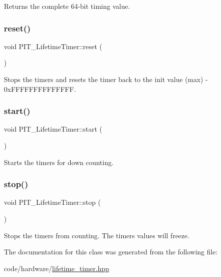 Returns the complete 64-\/bit timing value. 

\mbox{\label{classPIT__LifetimeTimer_a5c1c38cfa6c7a049a495ee3d89e13276}} 
\subsubsection{\texorpdfstring{reset()}{reset()}}
{\footnotesize\ttfamily void P\+I\+T\+\_\+\+Lifetime\+Timer\+::reset (\begin{DoxyParamCaption}{ }\end{DoxyParamCaption})\hspace{0.3cm}{\ttfamily [inline]}}



Stops the timers and resets the timer back to the init value (max) -\/ 0x\+F\+F\+F\+F\+F\+F\+F\+F\+F\+F\+F\+F\+FF. 

\mbox{\label{classPIT__LifetimeTimer_a6feabeff2529cabaf27ef53d027a4fc9}} 
\subsubsection{\texorpdfstring{start()}{start()}}
{\footnotesize\ttfamily void P\+I\+T\+\_\+\+Lifetime\+Timer\+::start (\begin{DoxyParamCaption}{ }\end{DoxyParamCaption})\hspace{0.3cm}{\ttfamily [inline]}}



Starts the timers for down counting. 

\mbox{\label{classPIT__LifetimeTimer_a92543f292044725b1dea4d009e01d9e4}} 
\subsubsection{\texorpdfstring{stop()}{stop()}}
{\footnotesize\ttfamily void P\+I\+T\+\_\+\+Lifetime\+Timer\+::stop (\begin{DoxyParamCaption}{ }\end{DoxyParamCaption})\hspace{0.3cm}{\ttfamily [inline]}}



Stops the timers from counting. The timers values will freeze. 



The documentation for this class was generated from the following file\+:\begin{DoxyCompactItemize}
\item 
code/hardware/\hyperlink{lifetime__timer_8hpp}{lifetime\+\_\+timer.\+hpp}\end{DoxyCompactItemize}

